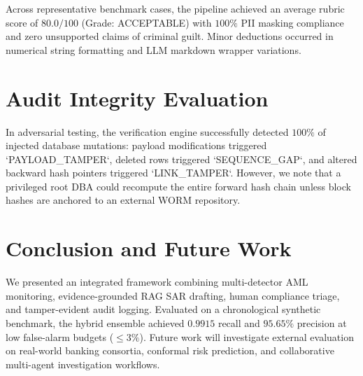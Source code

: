 \documentclass[10pt,journal,compsoc]{IEEEtran}
\begin{document}
Across representative benchmark cases, the pipeline achieved an average rubric score of $80.0 / 100$ (Grade: ACCEPTABLE) with $100\%$ PII masking compliance and zero unsupported claims of criminal guilt. Minor deductions occurred in numerical string formatting and LLM markdown wrapper variations.

\section{Audit Integrity Evaluation}
In adversarial testing, the verification engine successfully detected $100\%$ of injected database mutations: payload modifications triggered `PAYLOAD_TAMPER`, deleted rows triggered `SEQUENCE_GAP`, and altered backward hash pointers triggered `LINK_TAMPER`. However, we note that a privileged root DBA could recompute the entire forward hash chain unless block hashes are anchored to an external WORM repository.

\section{Conclusion and Future Work}
We presented an integrated framework combining multi-detector AML monitoring, evidence-grounded RAG SAR drafting, human compliance triage, and tamper-evident audit logging. Evaluated on a chronological synthetic benchmark, the hybrid ensemble achieved $0.9915$ recall and $95.65\%$ precision at low false-alarm budgets ($\le 3\%$). Future work will investigate external evaluation on real-world banking consortia, conformal risk prediction, and collaborative multi-agent investigation workflows.



\end{document}
